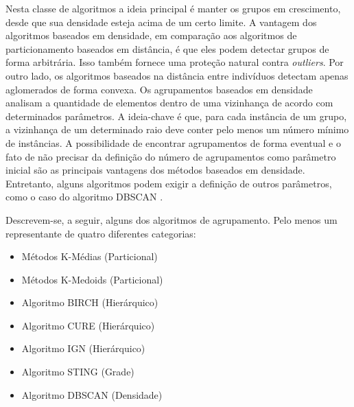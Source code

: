 \begin{itemize}
    	Nesta classe de algoritmos a ideia principal é manter os grupos em crescimento, desde que sua densidade esteja acima de um certo limite. A vantagem dos algoritmos baseados em densidade, em comparação aos algoritmos de particionamento baseados em distância, é que eles podem detectar grupos de forma arbitrária. Isso também fornece uma proteção natural contra \textit{outliers}. Por outro lado, os algoritmos baseados na distância entre indivíduos detectam apenas aglomerados de forma convexa.
        Os agrupamentos baseados em densidade analisam a quantidade de elementos dentro de uma vizinhança de acordo com determinados parâmetros. A ideia-chave é que, para cada instância de um grupo, a vizinhança de um determinado raio deve conter pelo menos um número mínimo de instâncias.
        A possibilidade de encontrar agrupamentos de forma eventual e o fato de não precisar da definição do número de agrupamentos \cite{yip2005} como parâmetro inicial são as principais vantagens dos métodos baseados em densidade. Entretanto, alguns algoritmos podem exigir a definição de outros parâmetros, como o caso do algoritmo \acrshort{DBSCAN} \cite{ESTER1996}.
\end{itemize}

Descrevem-se, a seguir, alguns dos algoritmos de agrupamento. Pelo menos um representante de quatro diferentes categorias:
\begin{itemize}
  \item Métodos K-Médias (Particional)
  \item Métodos K-Medoids (Particional)
  \item Algoritmo BIRCH (Hierárquico)
  \item Algoritmo CURE (Hierárquico)
  \item Algoritmo IGN (Hierárquico)
  \item Algoritmo STING (Grade)
  \item Algoritmo DBSCAN (Densidade)
\end{itemize}

